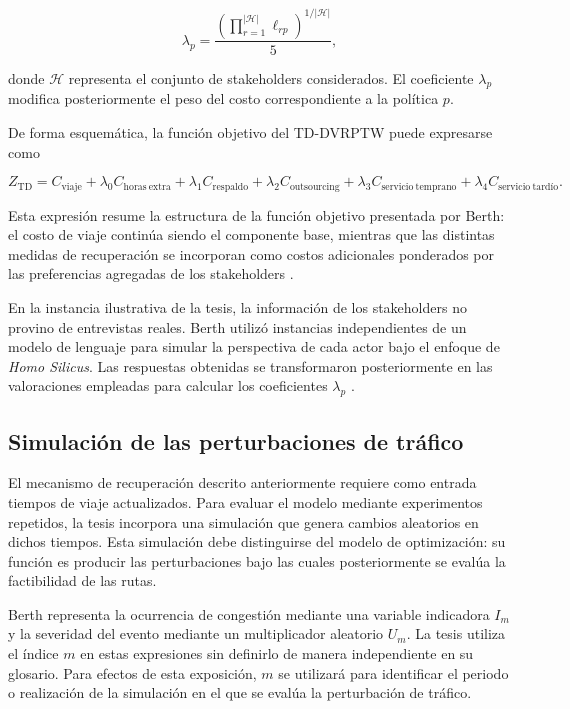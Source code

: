 \documentclass[11pt]{article}
\begin{document}
\[
\lambda_p=
\frac{
\left(
\prod_{r=1}^{|\mathcal{H}|}\ell_{rp}
\right)^{1/|\mathcal{H}|}
}{5},
\]

donde \(\mathcal{H}\) representa el conjunto de stakeholders considerados. El
coeficiente \(\lambda_p\) modifica posteriormente el peso del costo correspondiente
a la política \(p\).

De forma esquemática, la función objetivo del TD-DVRPTW puede expresarse como

\[
Z_{\mathrm{TD}}
=
C_{\mathrm{viaje}}
+
\lambda_0 C_{\mathrm{horas\ extra}}
+
\lambda_1 C_{\mathrm{respaldo}}
+
\lambda_2 C_{\mathrm{outsourcing}}
+
\lambda_3 C_{\mathrm{servicio\ temprano}}
+
\lambda_4 C_{\mathrm{servicio\ tardío}}.
\]

Esta expresión resume la estructura de la función objetivo presentada por Berth:
el costo de viaje continúa siendo el componente base, mientras que las distintas
medidas de recuperación se incorporan como costos adicionales ponderados por las
preferencias agregadas de los stakeholders
\parencite{berth_thesis_2025}.

En la instancia ilustrativa de la tesis, la información de los stakeholders no provino
de entrevistas reales. Berth utilizó instancias independientes de un modelo de lenguaje
para simular la perspectiva de cada actor bajo el enfoque de \textit{Homo Silicus}.
Las respuestas obtenidas se transformaron posteriormente en las valoraciones empleadas
para calcular los coeficientes \(\lambda_p\)
\parencite{berth_thesis_2025,horton_filippas_manning_2023}.

\subsection{Simulación de las perturbaciones de tráfico}

El mecanismo de recuperación descrito anteriormente requiere como entrada tiempos de
viaje actualizados. Para evaluar el modelo mediante experimentos repetidos, la tesis
incorpora una simulación que genera cambios aleatorios en dichos tiempos. Esta
simulación debe distinguirse del modelo de optimización: su función es producir las
perturbaciones bajo las cuales posteriormente se evalúa la factibilidad de las rutas.

Berth representa la ocurrencia de congestión mediante una variable indicadora \(I_m\)
y la severidad del evento mediante un multiplicador aleatorio \(U_m\). La tesis utiliza
el índice \(m\) en estas expresiones sin definirlo de manera independiente en su glosario.
Para efectos de esta exposición, \(m\) se utilizará para identificar el periodo o realización
de la simulación en el que se evalúa la perturbación de tráfico.
\end{document}
